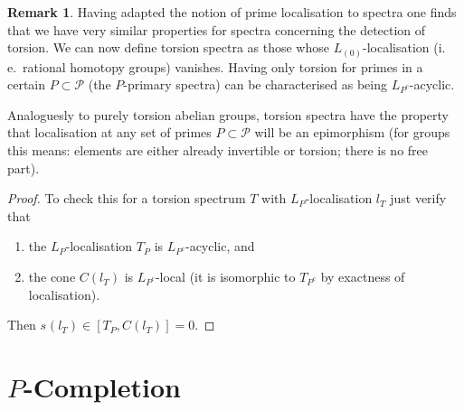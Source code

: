 \documentclass[english]{scrartcl}
\theoremstyle{definition}
\newtheorem*{Rem}{Remark}
\theoremstyle{remark}
\newcommand*{\idest}{i.\,e.\ }
\newcommand*{\Cone}[1]{C(#1)}
\newcommand*{\conem}[2][]{s^{#1}(#2)}  %
\newcommand*{\Ps}{P}  %
\newcommand*{\PS}{\mathcal{P}} %
\newcommand*{\LP}[1][\Ps]{L_{#1}}  %
\begin{document}
\begin{Rem}
  Having adapted the notion of prime localisation to spectra one finds
  that we have very similar properties for spectra concerning the
  detection of torsion. We can now define torsion spectra as those whose
  $\LP[(0)]$-localisation (\idest rational homotopy groups) vanishes.
  Having only torsion for primes in a certain $\Ps\subset\PS$ (the
  $\Ps$-primary spectra) can be characterised as being
  $\LP[\Ps^c]$-acyclic.

  Analoguesly to purely torsion abelian groups, torsion spectra have the
  property that localisation at any set of primes $\Ps\subset\PS$ will
  be an epimorphism (for groups this means: elements are either already
  invertible or torsion; there is no free part).
  \begin{proof}
    To check this for a torsion spectrum $T$ with $\LP$-localisation
    $l_T$ just verify that
    \begin{enumerate}[nosep]
    \item the $\LP$-localisation $T_{\Ps}$ is
      $\LP[\Ps^c]$-acyclic, and
    \item the cone $\Cone {l_T}$ is $\LP[\Ps^c]$-local
      (it is isomorphic to $T_{\Ps^c}$ by exactness of
      localisation).
    \end{enumerate}
    Then $\conem {l_T} \in [T_{\Ps}, \Cone {l_T}]=0$.
  \end{proof}
\end{Rem}

\section{$\Ps$-Completion}
\end{document}
